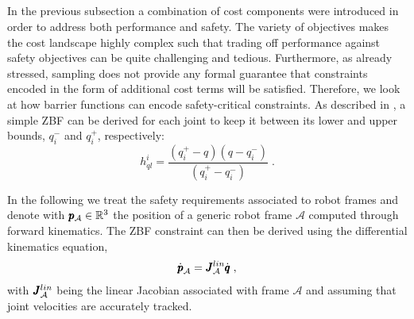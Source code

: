 
\subsection{ }
In the previous subsection a combination of cost components were introduced in order to address both performance and safety. The variety of objectives makes the cost landscape highly complex such that trading off performance against safety objectives can be quite challenging and tedious. Furthermore, as already stressed, sampling does not provide any formal guarantee that constraints encoded in the form of additional cost terms will be satisfied. Therefore, we look at how barrier functions can encode safety-critical constraints. As described in \cite{benzi2021optimization}, a simple ZBF can be derived for each joint to keep it between its lower and upper bounds, $q_i^-$ and $q_i^+$, respectively:
\begin{equation}
h_{ql}^i = \frac{(q_i^+ - q)(q - q_i^-)}{(q_i^+ - q_i^-)}\;.
\end{equation}

In the following we treat the safety requirements associated to robot frames and denote with $\pmb{p}_{\mathcal{A}} \in \mathbb{R}^{3}$ the position of a generic robot frame $\mathcal{A}$ computed through forward kinematics. The ZBF constraint can then be derived using the differential kinematics equation,
\begin{equation}
    \dot{\pmb{p}}_{\mathcal{A}} = \pmb{J}^{lin}_{\mathcal{A}} \dot{\pmb{q}}\;,
\end{equation}
with $\pmb{J}^{lin}_{\mathcal{A}}$ being the linear Jacobian associated with frame $\mathcal{A}$ and assuming that joint velocities are accurately tracked. 

